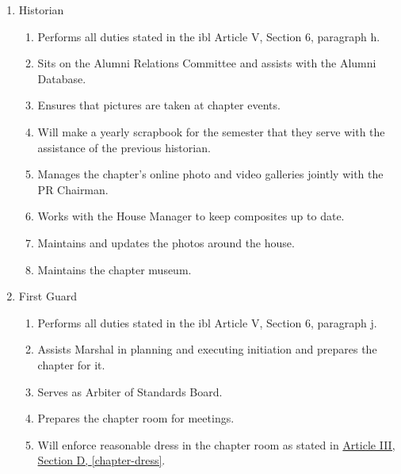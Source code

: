 \begin{enumerate}
		\item Historian
			\begin{enumerate}
				\item Performs all duties stated in the \gls{ibl} Article V, Section 6, paragraph h.
				\item Sits on the Alumni Relations Committee and assists with the Alumni Database.
				\item Ensures that pictures are taken at chapter events.
				\item Will make a yearly scrapbook for the semester that they serve with the assistance of the previous historian.
				\item Manages the chapter's online photo and video galleries jointly with the PR Chairman.
				\item Works with the House Manager to keep composites up to date.
				\item Maintains and updates the photos around the house.
				\item Maintains the chapter museum.
			\end{enumerate}
			
		
		\item First Guard
			\begin{enumerate}
				\item Performs all duties stated in the \gls{ibl} Article V, Section 6, paragraph j.
				\item Assists Marshal in planning and executing initiation and prepares the chapter for it.
				\item Serves as Arbiter of Standards Board.
				\item Prepares the chapter room for meetings.
				\item Will enforce reasonable dress in the chapter room as stated in \hyperref[chapter-dress]{Article III, Section D, \autoref*{chapter-dress}}. 
			\end{enumerate}


\end{enumerate}
